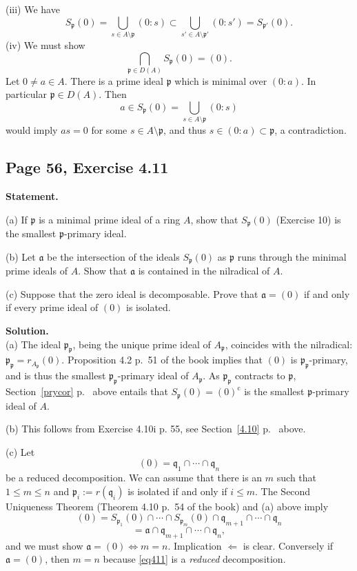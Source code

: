 \documentclass[parskip=half,fontsize=12pt]{scrartcl}%
\newcommand{\oo}{\operatorname}\newcommand{\ooo}{\operatorname*}
\newcommand{\mf}{\mathfrak}
\newcommand{\aaa}{\mf a}
\newcommand{\ppp}{\mf p}
\newcommand{\qqq}{\mf q}
\begin{document}
(iii) We have 
$$
S_\ppp(0)=\bigcup_{s\in A\setminus\ppp}(0:s)\subset\bigcup_{s'\in A\setminus\ppp'}(0:s')=S_{\ppp'}(0).
$$
(iv) We must show 
$$
\bigcap_{\ppp\in D(A)}S_\ppp(0)=(0).
$$ 
Let $0\ne a\in A$. There is a prime ideal $\ppp$ which is minimal over $(0:a)$. In particular $\ppp\in D(A)$. Then 
$$
a\in S_\ppp(0)=\bigcup_{s\in A\setminus\ppp}(0:s)
$$ 
would imply $as=0$ for some $s\in A\setminus\ppp$, and thus $s\in(0:a)\subset\ppp$, a contradiction.

\subsection{Page 56, Exercise 4.11}\label{411}%

\textbf{Statement.} 

(a) If $\ppp$ is a minimal prime ideal of a ring $A$, show that $S_\ppp(0)$ (Exercise 10) is the smallest $\ppp$-primary ideal.

(b) Let $\aaa$ be the intersection of the ideals $S_\ppp(0)$ as  $\ppp$ runs through the minimal prime ideals of $A$. Show that $\aaa$ is contained in the nilradical of $A$.

(c) Suppose that the zero ideal is decomposable. Prove that $\aaa=(0)$ if and only if every prime ideal of $(0)$ is isolated.

\textbf{Solution.}\\ (a) The ideal $\ppp_\ppp$, being the unique prime ideal of $A_\ppp$, coincides with the nilradical: $\ppp_\ppp=r_{A_\ppp}(0)$. Proposition 4.2 p.~51 of the book implies that $(0)$ is $\ppp_\ppp$-primary, and is thus the smallest $\ppp_\ppp$-primary ideal of $A_\ppp$. As $\ppp_\ppp$ contracts to $\ppp$, Section~\ref{prycor} p.~\pageref{prycor} above entails that $S_\ppp(0)=(0)^{\oo c}$ is the smallest $\ppp$-primary ideal of $A$. 

(b) This follows from Exercise 4.10i p. 55, see Section~\ref{4.10} p.~\pageref{4.10} above.

(c) Let 
$$
(0)=\qqq_1\cap\cdots\cap\qqq_n
$$ 
be a reduced decomposition. We can assume that there is an $m$ such that $1\le m\le n$ and $\ppp_i:=r(\qqq_i)$ is isolated if and only if $i\le m$. The Second Uniqueness Theorem (Theorem 4.10 p.~54 of the book) and (a) above imply 
\begin{equation}\label{eq411}
(0)=S_{\ppp_1}(0)\cap\cdots\cap S_{\ppp_m}(0)\cap\qqq_{m+1}\cap\cdots\cap\qqq_n
\end{equation} 
$$
=\aaa\cap\qqq_{m+1}\cap\cdots\cap\qqq_n,
$$ 
and we must show $\aaa=(0)\iff m=n$. Implication $\Longleftarrow$ is clear. Conversely if $\aaa=(0)$, then $m=n$ because \eqref{eq411} is a \emph{reduced} decomposition.
\end{document}
